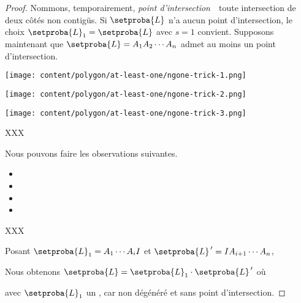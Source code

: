 \begin{proof}
	Nommons, temporairement, \og \emph{point d'intersection} \fg\ toute intersection de deux côtés non contigüs.
	Si $\setproba{L}$ n'a aucun point d'intersection,
	le choix $\setproba{L}_1 = \setproba{L}$ avec $s = 1$ convient.
	Supposons maintenant que $\setproba{L} = A_1 A_2 \cdots A_n$ admet au moins un point d'intersection.

	\begin{center}
		\texttt{[image: content/polygon/at-least-one/ngone-trick-1.png]}

		\texttt{[image: content/polygon/at-least-one/ngone-trick-2.png]}

		\texttt{[image: content/polygon/at-least-one/ngone-trick-3.png]}
	\end{center}


    XXX
    
    Nous pouvons faire les observations suivantes.
    \begin{itemize}
    	\item 

    	\item 

    	\item 

    	\item 
    \end{itemize}
	
	
	
	 
    XXX
    
   
	Posant
	$\setproba{L}_1 = A_1 \cdots A_i I$
    et
    $\setproba{L}^{\,\prime} = I A_{i+1} \cdots A_n$,
    
    \smallskip
    
    Nous obtenons $\setproba{L} = \setproba{L}_1 \cdot \setproba{L}^{\,\prime}$ où

    avec $\setproba{L}_1$ un \ngone, car non dégénéré et sans point d'intersection.
    
    
    
\end{proof}



